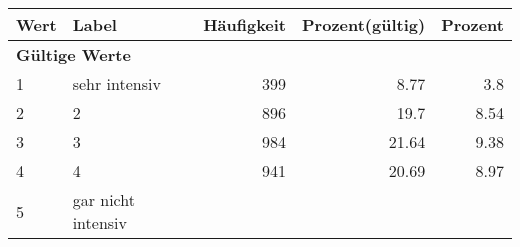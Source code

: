      \begin{longtable}{lXrrr}
     \toprule
     \textbf{Wert} & \textbf{Label} & \textbf{Häufigkeit} & \textbf{Prozent(gültig)} & \textbf{Prozent} \\
     \endhead
     \midrule
     \multicolumn{5}{l}{\textbf{Gültige Werte}}\\

     1 &
     \multicolumn{1}{X}{ sehr intensiv   } &


       \num{399} &
       \num[round-mode=places,round-precision=2]{8,77} &
         \num[round-mode=places,round-precision=2]{3,8} \\

     2 &
     \multicolumn{1}{X}{ 2   } &


       \num{896} &
       \num[round-mode=places,round-precision=2]{19,7} &
         \num[round-mode=places,round-precision=2]{8,54} \\

     3 &
     \multicolumn{1}{X}{ 3   } &


       \num{984} &
       \num[round-mode=places,round-precision=2]{21,64} &
         \num[round-mode=places,round-precision=2]{9,38} \\

     4 &
     \multicolumn{1}{X}{ 4   } &


       \num{941} &
       \num[round-mode=places,round-precision=2]{20,69} &
         \num[round-mode=places,round-precision=2]{8,97} \\

     5 &
     \multicolumn{1}{X}{ gar nicht intensiv   } &



\end{longtable}
